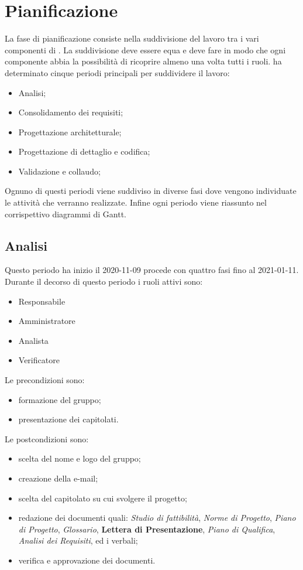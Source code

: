\section{Pianificazione}
La fase di pianificazione consiste nella suddivisione del lavoro tra i vari componenti di \Gruppo. La suddivisione deve essere equa e deve fare in modo che ogni componente abbia la possibilità di ricoprire almeno una volta tutti i ruoli.
\Gruppo ha determinato cinque periodi principali per suddividere il lavoro:
\begin{itemize}
\item Analisi;
\item Consolidamento dei requisiti;
\item Progettazione architetturale;
\item Progettazione di dettaglio e codifica;
\item Validazione e collaudo;
\end{itemize}
Ognuno di questi periodi viene suddiviso in diverse fasi dove vengono individuate le attività che verranno realizzate.
Infine ogni periodo viene riassunto nel corrispettivo diagrammi di Gantt.
\subsection{Analisi}
Questo periodo ha inizio il 2020-11-09 procede con quattro fasi fino al 2021-01-11.
Durante il decorso di questo periodo i ruoli attivi sono:
\begin{itemize}
\item Responsabile
\item Amministratore
\item Analista
\item Verificatore
\end{itemize}
Le precondizioni sono:
\begin{itemize}
	\item formazione del gruppo;
	\item presentazione dei capitolati.
\end{itemize}
Le postcondizioni sono:
\begin{itemize}
	\item scelta del nome e logo del gruppo;
	\item creazione della e-mail;
	\item scelta del capitolato su cui svolgere il progetto;
	\item redazione dei documenti quali: \textit{Studio di fattibilità}, \textit{Norme di Progetto}, \textit{Piano di Progetto}, \textit{Glossario}, \textbf{Lettera di Presentazione}, \textit{Piano di Qualifica}, \textit{Analisi dei Requisiti}, ed i verbali;
	\item verifica e approvazione dei documenti.
\end{itemize}
